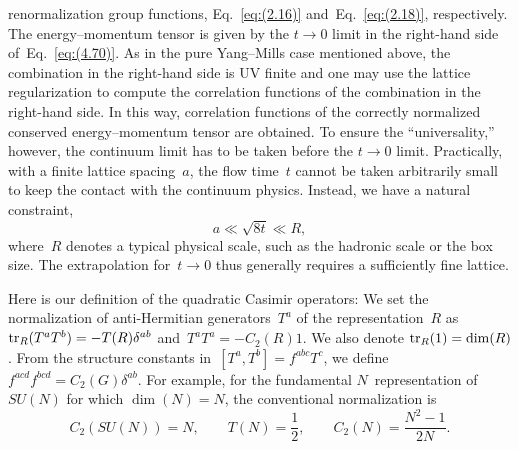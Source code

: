 renormalization group functions, Eq.~\eqref{eq:(2.16)}
and~Eq.~\eqref{eq:(2.18)}, respectively. The energy--momentum tensor is given
by the $t\to0$ limit in the right-hand side of~Eq.~\eqref{eq:(4.70)}. As in the
pure Yang--Mills case mentioned above, the combination in the right-hand side
is UV finite and one may use the lattice regularization to compute the
correlation functions of the combination in the right-hand side. In this way,
correlation functions of the correctly normalized conserved energy--momentum
tensor are obtained. To ensure the ``universality,'' however, the continuum
limit has to be taken before the $t\to0$ limit. Practically, with a finite
lattice spacing~$a$, the flow time~$t$ cannot be taken arbitrarily small to
keep the contact with the continuum physics. Instead, we have a natural
constraint,
\begin{equation}
   a\ll\sqrt{8t}\ll R,
\label{eq:(1.2)}
\end{equation}
where~$R$ denotes a typical physical scale, such as the hadronic scale or the
box size. The extrapolation for~$t\to0$ thus generally requires a sufficiently
fine lattice.

Here is our definition of the quadratic Casimir operators: We set the
normalization of anti-Hermitian generators~$T^a$ of the representation~$R$
as~$\operatorname{tr}_R(T^aT^b)=-T(R)\delta^{ab}$ and~$T^aT^a=-C_2(R)1$. We also denote
$\operatorname{tr}_R(1)=\dim(R)$. From the structure constants in~$[T^a,T^b]=f^{abc}T^c$, we
define $f^{acd}f^{bcd}=C_2(G)\delta^{ab}$. For example, for the fundamental
$N$~representation of~$SU(N)$ for which $\dim(N)=N$, the conventional
normalization is
\begin{equation}
   C_2(SU(N))=N,\qquad T(N)=\frac{1}{2},\qquad
   C_2(N)=\frac{N^2-1}{2N}.
\label{eq:(1.3)}
\end{equation}
